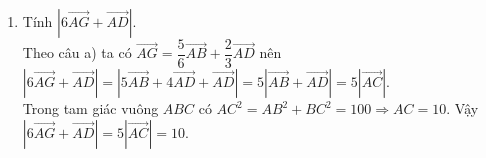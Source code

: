 \begin{bt}
{\begin{enumerate}
\begin{itemize}
\begin{align*}
			&=\dfrac{1}{2}\overrightarrow{AB}+\dfrac{1}{2}(\overrightarrow{AD}+\overrightarrow{DI})+\dfrac{1}{3}\cdot \left(- \dfrac{1}{2}\right)  \left( \overrightarrow{CI}+\overrightarrow{CB}\right) \\
			&=\dfrac{1}{2}\overrightarrow{AB}+\dfrac{1}{2}\overrightarrow{AD}+\dfrac{1}{4}\overrightarrow{AB}+\dfrac{1}{3}\cdot \dfrac{1}{2}\overrightarrow{AB}+\dfrac{1}{6}\overrightarrow{AD}\\
			&=\dfrac{5}{6}\overrightarrow{AB}+\dfrac{2}{3}\overrightarrow{AD}.
			\end{align*}
			Vậy $\overrightarrow{AG}=\dfrac{5}{6}\overrightarrow{AB}+\dfrac{2}{3}\overrightarrow{AD}.$
		\end{itemize}
		\item Tính $|6\overrightarrow{AG}+\overrightarrow{AD}|$.\\
		Theo câu a) ta có $\overrightarrow{AG}=\dfrac{5}{6}\overrightarrow{AB}+\dfrac{2}{3}\overrightarrow{AD}$ nên
		$|6\overrightarrow{AG}+\overrightarrow{AD}|=|5\overrightarrow{AB}+4\overrightarrow{AD}+\overrightarrow{AD}|=5|\overrightarrow{AB}+\overrightarrow{AD}|=5|\overrightarrow{AC}|.$\\
		Trong tam giác vuông $ABC$ có $AC^2=AB^2+BC^2=100 \Rightarrow AC=10.$ Vậy 
		$|6\overrightarrow{AG}+\overrightarrow{AD}|=5|\overrightarrow{AC}|=10.$
	\end{enumerate}}	
\end{bt}

